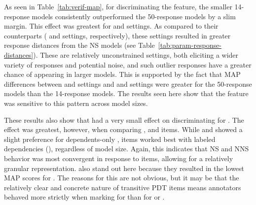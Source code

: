 As seen in Table~\ref{tab:verif-map}, for discriminating the  feature, the smaller 14-response models consistently outperformed the 50-response models by a slim margin. This effect was greatest for  and  settings. As compared to their counterparts ( and  settings, respectively), these settings resulted in greater response distances from the NS models (see Table~\ref{tab:param-response-distances}). These are relatively unconstrained settings, both eliciting a wider variety of responses and potential noise, and such outlier responses have a greater chance of appearing in larger models. This is supported by the fact that MAP differences between  and  settings and  and  settings were greater for the 50-response models than the 14-response models. The results seen here show that the  feature was sensitive to this pattern across model sizes. 

These results also show that  had a very small effect on discriminating for . The effect was greatest, however, when comparing ,  and  items. While  and  showed a slight preference for dependents-only ,  items worked best with labeled dependencies (), regardless of model size. Again, this indicates that NS and NNS behavior was most convergent in response to  items, allowing for a relatively granular representation.  also stand out here because they resulted in the lowest MAP scores for . The reasons for this are not obvious, but it may be that the relatively clear and concrete nature of transitive PDT items means annotators behaved more strictly when marking  for  than for  or .


